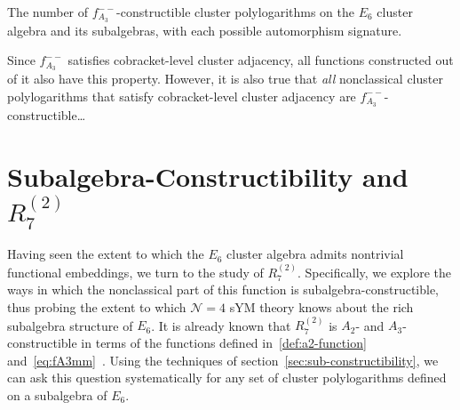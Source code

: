 \documentclass[11pt]{article}
\def\pdfeq#1{\texorpdfstring{$#1$}{a}}
\begin{document}
\begin{table}
\begin{center}
\end{center}

\caption{The number of $f_{A_3}^{--}$-constructible cluster polylogarithms on the $E_6$ cluster algebra and its subalgebras, with each possible automorphism signature.}
\label{table:nonclassical_A3_constructible_dimensions}
\end{table}

Since $f_{A_3}^{--}$ satisfies cobracket-level cluster adjacency, all functions constructed out of it also have this property. However, it is also true that \emph{all} nonclassical cluster polylogarithms that satisfy cobracket-level cluster adjacency are $f_{A_3}^{--}$-constructible\dots

\section{Subalgebra-Constructibility and \pdfeq{R^{(2)}_7}} \label{sec:r27-sub-constructibility}

Having seen the extent to which the $E_6$ cluster algebra admits nontrivial functional embeddings, we turn to the study of $R^{(2)}_{7}$\!. Specifically, we explore the ways in which the nonclassical part of this function is subalgebra-constructible, thus probing the extent to which $\mathcal{N}=4$ sYM theory knows about the rich subalgebra structure of $E_6$. It is already known that $R^{(2)}_7$ is $A_2$- and $A_3$-constructible in terms of the functions defined in~\eqref{def:a2-function} and~\eqref{eq:fA3mm}~\cite{Golden:2014xqa}. Using the techniques of section~\ref{sec:sub-constructibility}, we can ask this question systematically for any set of cluster polylogarithms defined on a subalgebra of $E_6$.
\end{document}
